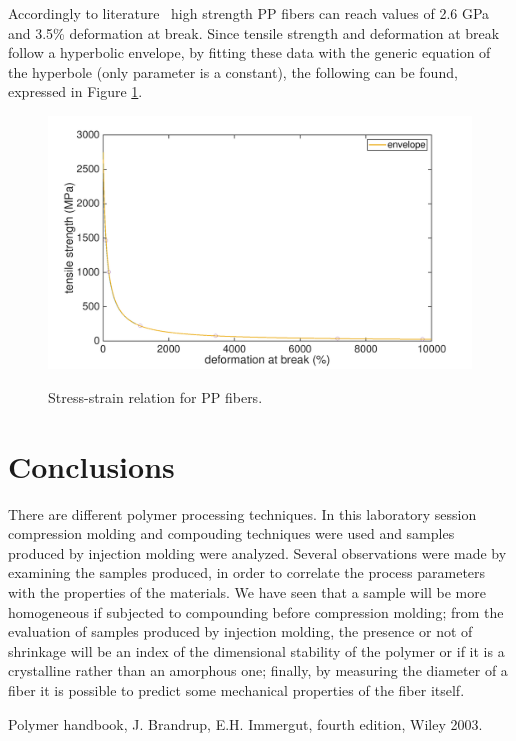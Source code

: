 \documentclass[a4paper, 11pt]{article}
\begin{document}
Accordingly to literature~\cite{encyclopedia} high strength PP fibers can reach values of 2.6 GPa and 3.5\% deformation at break. Since tensile strength and deformation at break follow a hyperbolic envelope, by fitting these data with the generic equation of the hyperbole (only parameter is a constant), the following can be found, expressed in Figure \ref{fig:hyperbole}.
\begin{figure}[htp]
	\centering
	\includegraphics[scale=0.15]
	{hyperbole.png}
	\label{fig:hyperbole}
	\caption{Stress-strain relation for PP fibers.}
\end{figure}

\section{Conclusions}


There are different polymer processing techniques. In this laboratory session compression molding and compouding techniques were used and samples produced by injection molding were analyzed.
Several observations were made by examining the samples produced, in order to correlate the process parameters with the properties of the materials.
We have seen that a sample will be more homogeneous if subjected to compounding before compression molding; from the evaluation of samples produced by injection molding, the presence or not of shrinkage will be an index of the dimensional stability of the polymer or if it is a crystalline rather than an amorphous one; finally, by measuring the diameter of a fiber it is possible to predict some mechanical properties of the fiber itself.

\begin{thebibliography}{1}

 Polymer handbook, J. Brandrup, E.H. Immergut, fourth edition, Wiley 2003.
\end{thebibliography}
\end{document}
